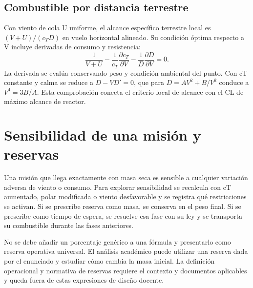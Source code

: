 \subsection{Combustible por distancia terrestre}
Con viento de cola U uniforme, el alcance específico terrestre local es $(V+U)/(c_TD)$ en vuelo horizontal alineado. Su condición óptima respecto a V incluye derivadas de consumo y resistencia:
\begin{equation}
\frac1{V+U}-\frac1{c_T}\frac{\partial c_T}{\partial V}
-\frac1D\frac{\partial D}{\partial V}=0.
\end{equation}
La derivada se evalúa conservando peso y condición ambiental del punto. Con cT constante y calma se reduce a $D-VD'=0$, que para $D=AV^2+B/V^2$ conduce a $V^4=3B/A$. Esta comprobación conecta el criterio local de alcance con el CL de máximo alcance de reactor.

\section{Sensibilidad de una misión y reservas}
Una misión que llega exactamente con masa seca es sensible a cualquier variación adversa de viento o consumo. Para explorar sensibilidad se recalcula con cT aumentado, polar modificada o viento desfavorable y se registra qué restricciones se activan. Si se prescribe reserva como masa, se conserva en el peso final. Si se prescribe como tiempo de espera, se resuelve esa fase con su ley y se transporta su combustible durante las fases anteriores.

No se debe añadir un porcentaje genérico a una fórmula y presentarlo como reserva operativa universal. El análisis académico puede utilizar una reserva dada por el enunciado y estudiar cómo cambia la masa inicial. La definición operacional y normativa de reservas requiere el contexto y documentos aplicables y queda fuera de estas expresiones de diseño docente.
